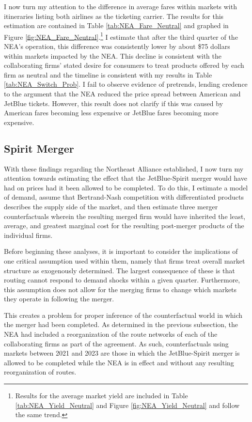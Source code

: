\documentclass{article}
\begin{document}
	 I now turn my attention to the difference in average fares within markets with itineraries listing both airlines as the ticketing carrier. The results for this estimation are contained in Table \ref{tab:NEA_Fare_Neutral} and graphed in Figure \ref{fig:NEA_Fare_Neutral}.\footnote{Results for the average market yield are included in Table \ref{tab:NEA_Yield_Neutral} and Figure \ref{fig:NEA_Yield_Neutral} and follow the same trend.} I estimate that after the third quarter of the NEA's operation, this difference was consistently lower by about \$75 dollars within markets impacted by the NEA. This decline is consistent with the collaborating firms' stated desire for consumers to treat products offered by each firm as neutral and the timeline is consistent with my results in Table \ref{tab:NEA_Switch_Prob}. I fail to observe evidence of pretrends, lending credence to the argument that the NEA reduced the price spread between American and JetBlue tickets. However, this result does not clarify if this was caused by American fares becoming less expensive or JetBlue fares becoming more expensive. 	

	
	\subsection{Spirit Merger}
	With these findings regarding the Northeast Alliance established, I now turn my attention towards estimating the effect that the JetBlue-Spirit merger would have had on prices had it been allowed to be completed. To do this, I estimate a model of demand, assume that Bertrand-Nash competition with differentiated products describes the supply side of the market, and then estimate three merger counterfactuals wherein the resulting merged firm would have inherited the least, average, and greatest marginal cost for the resulting post-merger products of the individual firms. 
	
	Before beginning these analyses, it is important to consider the implications of one critical assumption used within them, namely that firms treat overall market structure as exogenously determined. The largest consequence of these is that routing cannot respond to demand shocks within a given quarter. Furthermore, this assumption does not allow for the merging firms to change which markets they operate in following the merger.
	
	This creates a problem for proper inference of the counterfactual world in which the merger had been completed. As determined in the previous subsection, the NEA had included a reorganization of the route networks of each of the collaborating firms as part of the agreement. As such, counterfactuals using markets between 2021 and 2023 are those in which the JetBlue-Spirit merger is allowed to be completed while the NEA is in effect and without any resulting reorganization of routes. 
	
\end{document}
